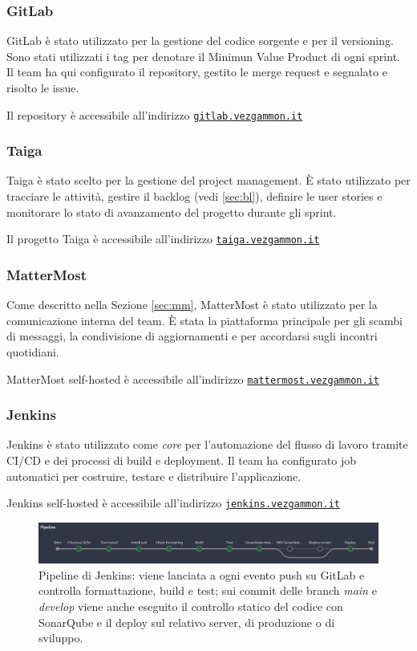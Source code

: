 \documentclass{article}
\begin{document}
\subsubsection{GitLab}
GitLab è stato utilizzato per la gestione del codice sorgente e per il versioning. Sono stati utilizzati i tag per denotare 
il Minimun Value Product di ogni sprint. 
Il team ha qui configurato il repository, gestito le merge request e segnalato e risolto le issue.

Il repository è accessibile all'indirizzo \href{https://gitlab.vezgammon.it}{\texttt{gitlab.vezgammon.it}}  

\subsubsection{Taiga}
Taiga è stato scelto per la gestione del project management. È stato utilizzato per tracciare le attività, gestire il 
backlog (vedi \ref{sec:bl}), definire le user stories e monitorare lo stato di avanzamento del progetto durante gli sprint.

Il progetto Taiga è accessibile all'indirizzo \href{https://taiga.vezgammon.it}{\texttt{taiga.vezgammon.it}}

\subsubsection{MatterMost}
Come descritto nella Sezione \ref{sec:mm}, MatterMost è stato utilizzato per la comunicazione interna del team. È stata 
la piattaforma principale per gli scambi di messaggi, la condivisione di aggiornamenti e per accordarsi sugli incontri quotidiani.

MatterMost self-hosted è accessibile all'indirizzo \href{https://mattermost.vezgammon.it}{\texttt{mattermost.vezgammon.it}}

\subsubsection{Jenkins}
Jenkins è stato utilizzato come \textit{core} per l'automazione del flusso di lavoro tramite CI/CD e dei processi di build 
e deployment. Il team ha configurato job automatici per costruire, testare e distribuire l'applicazione.

Jenkins self-hosted è accessibile all'indirizzo \href{https://jenkins.vezgammon.it}{\texttt{jenkins.vezgammon.it}}

\begin{figure}[H]
    \centering
    \includegraphics[width=1\textwidth]{report-jk_pipeline}
    \caption{Pipeline di Jenkins: viene lanciata a ogni evento push su GitLab e controlla formattazione, build e test; sui 
    commit delle branch \textit{main} e \textit{develop} viene anche eseguito il controllo statico del codice con SonarQube 
    e il deploy sul relativo server, di produzione o di sviluppo.}
    \label{fig:jk_pipeline}
\end{figure}
\end{document}
